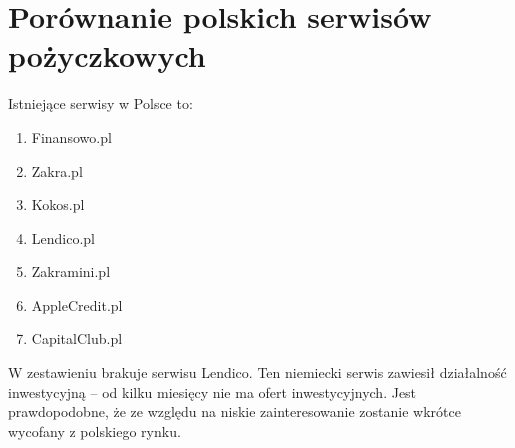 \documentclass[a4paper,twoside,titlepage,openright]{book}
\begin{document}
\section{Porównanie polskich serwisów pożyczkowych}

Istniejące serwisy w Polsce to:

\begin{enumerate}

	\item Finansowo.pl \cite{finansowoPl}
	\item Zakra.pl \cite{zakraPl}
	\item Kokos.pl \cite{kokosPl}
	\item Lendico.pl \cite{lendicoPl}
	\item Zakramini.pl \cite{zakraminiPl}
	\item AppleCredit.pl \cite{applecreditPl}
	\item CapitalClub.pl \cite{capitalclubPl}

\end{enumerate}

\begin{small}
\noindent
{}
\end{small}

W zestawieniu brakuje serwisu Lendico. Ten niemiecki serwis zawiesił działalność inwestycyjną -- od kilku miesięcy nie ma ofert inwestycyjnych. Jest prawdopodobne, że ze względu na niskie zainteresowanie zostanie wkrótce wycofany z polskiego rynku.
\end{document}
